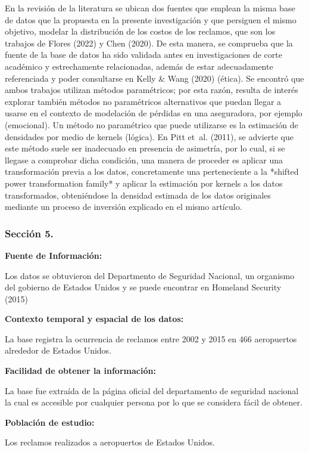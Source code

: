 \documentclass[
  letterpaper,
  onepage,
  openany]{scrreprt}
\begin{document}
En la revisión de la literatura se ubican dos fuentes que emplean la
misma base de datos que la propuesta en la presente investigación y que
persiguen el mismo objetivo, modelar la distribución de los costos de
los reclamos, que son los trabajos de Flores (2022) y Chen (2020). De
esta manera, se comprueba que la fuente de la base de datos ha sido
validada antes en investigaciones de corte académico y estrechamente
relacionadas, además de estar adecuadamente referenciada y poder
consultarse en Kelly \& Wang (2020) (ética). Se encontró que ambos
trabajos utilizan métodos paramétricos; por esta razón, resulta de
interés explorar también métodos no paramétricos alternativos que puedan
llegar a usarse en el contexto de modelación de pérdidas en una
aseguradora, por ejemplo (emocional). Un método no paramétrico que puede
utilizarse es la estimación de densidades por medio de kernels (lógica).
En Pitt et~al. (2011), se advierte que este método suele ser inadecuado
en presencia de asimetría, por lo cual, si se llegase a comprobar dicha
condición, una manera de proceder es aplicar una transformación previa a
los datos, concretamente una perteneciente a la *shifted power
transformation family* y aplicar la estimación por kernels a los datos
transformados, obteniéndose la densidad estimada de los datos originales
mediante un proceso de inversión explicado en el mismo artículo.

\hypertarget{secciuxf3n-5.}{%
\subsubsection{Sección 5.}\label{secciuxf3n-5.}}

\textbf{Fuente de Información:}

Los datos se obtuvieron del Departmento de Seguridad Nacional, un
organismo del gobierno de Estados Unidos y se puede encontrar en
Homeland Security (2015)

\textbf{Contexto temporal y espacial de los datos:}

La base registra la ocurrencia de reclamos entre 2002 y 2015 en 466
aeropuertos alrededor de Estados Unidos.

\textbf{Facilidad de obtener la información:}

La base fue extraída de la página oficial del departamento de seguridad
nacional la cual es accesible por cualquier persona por lo que se
considera fácil de obtener.

\textbf{Población de estudio:}

Los reclamos realizados a aeropuertos de Estados Unidos.
\end{document}
